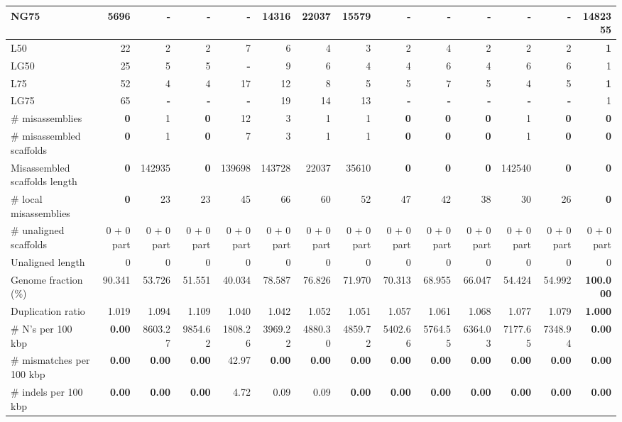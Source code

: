 \documentclass[12pt]{article}
\begin{document}
\begin{table}[ht]
\begin{center}
{\begin{tabular}{|l*{13}{|r}|}
NG75 & 5696 & - & - & - & 14316 & 22037 & 15579 & - & - & - & - & - & {\bf 1482355} \\ \hline
L50 & 22 & 2 & 2 & 7 & 6 & 4 & 3 & 2 & 4 & 2 & 2 & 2 & {\bf 1} \\ \hline
LG50 & 25 & 5 & 5 & {\bf -} & 9 & 6 & 4 & 4 & 6 & 4 & 6 & 6 & 1 \\ \hline
L75 & 52 & 4 & 4 & 17 & 12 & 8 & 5 & 5 & 7 & 5 & 4 & 5 & {\bf 1} \\ \hline
LG75 & 65 & {\bf -} & {\bf -} & {\bf -} & 19 & 14 & 13 & {\bf -} & {\bf -} & {\bf -} & {\bf -} & {\bf -} & 1 \\ \hline
\# misassemblies & {\bf 0} & 1 & {\bf 0} & 12 & 3 & 1 & 1 & {\bf 0} & {\bf 0} & {\bf 0} & 1 & {\bf 0} & {\bf 0} \\ \hline
\# misassembled scaffolds & {\bf 0} & 1 & {\bf 0} & 7 & 3 & 1 & 1 & {\bf 0} & {\bf 0} & {\bf 0} & 1 & {\bf 0} & {\bf 0} \\ \hline
Misassembled scaffolds length & {\bf 0} & 142935 & {\bf 0} & 139698 & 143728 & 22037 & 35610 & {\bf 0} & {\bf 0} & {\bf 0} & 142540 & {\bf 0} & {\bf 0} \\ \hline
\# local misassemblies & {\bf 0} & 23 & 23 & 45 & 66 & 60 & 52 & 47 & 42 & 38 & 30 & 26 & {\bf 0} \\ \hline
\# unaligned scaffolds & 0 + 0 part & 0 + 0 part & 0 + 0 part & 0 + 0 part & 0 + 0 part & 0 + 0 part & 0 + 0 part & 0 + 0 part & 0 + 0 part & 0 + 0 part & 0 + 0 part & 0 + 0 part & 0 + 0 part \\ \hline
Unaligned length & 0 & 0 & 0 & 0 & 0 & 0 & 0 & 0 & 0 & 0 & 0 & 0 & 0 \\ \hline
Genome fraction (\%) & 90.341 & 53.726 & 51.551 & 40.034 & 78.587 & 76.826 & 71.970 & 70.313 & 68.955 & 66.047 & 54.424 & 54.992 & {\bf 100.000} \\ \hline
Duplication ratio & 1.019 & 1.094 & 1.109 & 1.040 & 1.042 & 1.052 & 1.051 & 1.057 & 1.061 & 1.068 & 1.077 & 1.079 & {\bf 1.000} \\ \hline
\# N's per 100 kbp & {\bf 0.00} & 8603.27 & 9854.62 & 1808.26 & 3969.22 & 4880.30 & 4859.72 & 5402.66 & 5764.55 & 6364.03 & 7177.65 & 7348.94 & {\bf 0.00} \\ \hline
\# mismatches per 100 kbp & {\bf 0.00} & {\bf 0.00} & {\bf 0.00} & 42.97 & {\bf 0.00} & {\bf 0.00} & {\bf 0.00} & {\bf 0.00} & {\bf 0.00} & {\bf 0.00} & {\bf 0.00} & {\bf 0.00} & {\bf 0.00} \\ \hline
\# indels per 100 kbp & {\bf 0.00} & {\bf 0.00} & {\bf 0.00} & 4.72 & 0.09 & 0.09 & {\bf 0.00} & {\bf 0.00} & {\bf 0.00} & {\bf 0.00} & {\bf 0.00} & {\bf 0.00} & {\bf 0.00} \\ \hline

\end{tabular}}
\end{center}
\end{table}
\end{document}
